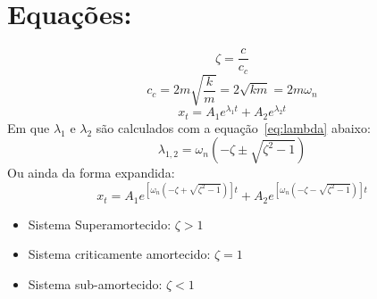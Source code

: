 

\section{Equações:}%
\begin{equation}\label{eq:zeta}
\zeta=\frac{c}{c_{c}}
\end{equation}
\begin{equation}\label{eq:Cc}
c_{c}=2 m \sqrt{\frac{k}{m}}=2 \sqrt{k m}=2 m \omega_{n}
\end{equation}
\begin{equation}\label{eq:xt}
    x_{t}=A_{1} e^{\lambda_{1} t}+A_{2} e^{\lambda_{2} t}
\end{equation}
Em que $\lambda_1$ e $\lambda_2$ são calculados com a equação~\ref{eq:lambda}
abaixo:
\begin{equation}\label{eq:lambda}
\lambda_{1,2}=\omega_{n}\left(-\zeta\pm \sqrt{\zeta^{2}-1}\right)
\end{equation}
Ou ainda da forma expandida:
\begin{equation}\label{eq:xt_expandida}
x_{t}=A_{1} e^{\left[\omega_{n}(-\zeta+\sqrt{\zeta^{2}-1})\right] t}+A_{2} e^{\left[\omega_{n}(-\zeta-\sqrt{\zeta^{2}-1})\right] t}
\end{equation}

\begin{itemize}
    \item Sistema Superamortecido: $\zeta > 1$
    \item Sistema criticamente amortecido: $\zeta = 1$
    \item Sistema sub-amortecido: $\zeta < 1$
\end{itemize}

